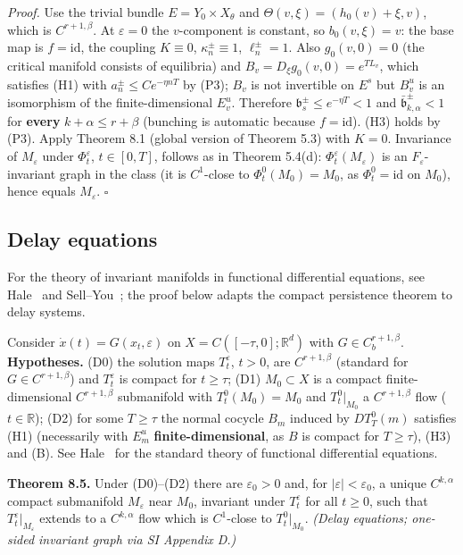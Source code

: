 \documentclass[11pt,a4paper]{article}
\theoremstyle{plain}
\theoremstyle{definition}
\theoremstyle{remark}
\numberwithin{equation}{section}
\numberwithin{figure}{section}
\begin{document}
\textit{Proof.} Use the trivial bundle $E=Y_0\times X_\theta$ and $\Theta(v,\xi)=(h_0(v)+\xi,v)$, which is $C^{r+1,\beta}$. At $\varepsilon=0$ the $v$-component is constant, so $b_0(v,\xi)=v$: the base map is $f=\mathrm{id}$, the coupling $K\equiv0$, $\kappa^\pm_n\equiv1$, $\ell_n^\pm=1$. Also $g_0(v,0)=0$ (the critical manifold consists of equilibria) and $B_v=D_\xi g_0(v,0)=e^{TL_v}$, which satisfies (H1) with $a^\pm_n\le Ce^{-\eta nT}$ by (P3); $B_v$ is not invertible on $E^s$ but $B^u_v$ is an isomorphism of the finite-dimensional $E^u_v$. Therefore $\mathfrak b^\pm_s\le e^{-\eta T}<1$ and $\bar{\mathfrak b}^\pm_{k,\alpha}<1$ for \textbf{every} $k+\alpha\le r+\beta$ (bunching is automatic because $f=\mathrm{id}$). (H3) holds by (P3). Apply Theorem 8.1 (global version of Theorem 5.3) with $K=0$. Invariance of $M_\varepsilon$ under $\Phi^\varepsilon_t$, $t\in[0,T]$, follows as in Theorem 5.4(d): $\Phi^\varepsilon_t(M_\varepsilon)$ is an $F_\varepsilon$-invariant graph in the class (it is $C^1$-close to $\Phi_t^0(M_0)=M_0$, as $\Phi^0_t=\mathrm{id}$ on $M_0$), hence equals $M_\varepsilon$. $\square$

\subsection{Delay equations}

For the theory of invariant manifolds in functional differential equations, see Hale~\cite{hal77} and Sell–You~\cite{sell2002}; the proof below adapts the compact persistence theorem to delay systems.

Consider $\dot x(t)=G(x_t,\varepsilon)$ on $X=C([-\tau,0];\mathbb R^d)$ with $G\in C^{r+1,\beta}_b$. \textbf{Hypotheses.} (D0) the solution maps $T^\varepsilon_t$, $t>0$, are $C^{r+1,\beta}$ (standard for $G\in C^{r+1,\beta}$) and $T^\varepsilon_t$ is compact for $t\ge\tau$; (D1) $M_0\subset X$ is a compact finite-dimensional $C^{r+1,\beta}$ submanifold with $T^0_t(M_0)=M_0$ and $T^0_t|_{M_0}$ a $C^{r+1,\beta}$ flow ($t\in\mathbb R$); (D2) for some $T\ge\tau$ the normal cocycle $B_m$ induced by $DT^0_T(m)$ satisfies (H1) (necessarily with $E^u_m$ \textbf{finite-dimensional}, as $B$ is compact for $T\ge\tau$), (H3) and (B). See Hale~\cite{hal77} for the standard theory of functional differential equations.

\textbf{Theorem 8.5.} Under (D0)–(D2) there are $\varepsilon_0>0$ and, for $|\varepsilon|<\varepsilon_0$, a unique $C^{k,\alpha}$ compact submanifold $M_\varepsilon$ near $M_0$, invariant under $T^\varepsilon_t$ for all $t\ge0$, such that $T_t^\varepsilon|_{M_\varepsilon}$ extends to a $C^{k,\alpha}$ flow which is $C^1$-close to $T^0_t|_{M_0}$. \textit{(Delay equations; one-sided invariant graph via SI Appendix D.)}
\end{document}
